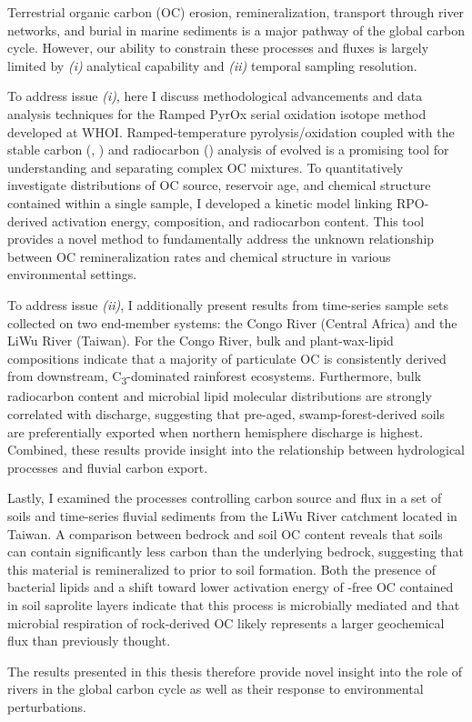 \setcounter{savepage}{\thepage}
\begin{abstractpage}

Terrestrial organic carbon (OC) erosion, remineralization, transport through river networks, and burial in marine sediments is a major pathway of the global carbon cycle. However, our ability to constrain these processes and fluxes is largely limited by \textit{(i)} analytical capability and \textit{(ii)} temporal sampling resolution. 

To address issue \textit{(i)}, here I discuss methodological advancements and data analysis techniques for the Ramped PyrOx serial oxidation isotope method developed at WHOI. Ramped-temperature pyrolysis/oxidation coupled with the stable carbon (, ) and radiocarbon () analysis of evolved  is a promising tool for understanding and separating complex OC mixtures. To quantitatively investigate distributions of OC source, reservoir age, and chemical structure contained within a single sample, I developed a kinetic model linking RPO-derived activation energy,  composition, and radiocarbon content. This tool provides a novel method to fundamentally address the unknown relationship between OC remineralization rates and chemical structure in various environmental settings.

To address issue \textit{(ii)}, I additionally present results from time-series sample sets collected on two end-member systems: the Congo River (Central Africa) and the LiWu River (Taiwan). For the Congo River, bulk and plant-wax-lipid  compositions indicate that a majority of particulate OC is consistently derived from downstream, C\textsubscript{3}-dominated rainforest ecosystems.  Furthermore, bulk radiocarbon content and microbial lipid molecular distributions are strongly correlated with discharge, suggesting that pre-aged, swamp-forest-derived soils are preferentially exported when northern hemisphere discharge is highest. Combined, these results provide insight into the relationship between hydrological processes and fluvial carbon export.

Lastly, I examined the processes controlling carbon source and flux in a set of soils and time-series fluvial sediments from the LiWu River catchment located in Taiwan. A comparison between bedrock and soil OC content reveals that soils can contain significantly less carbon than the underlying bedrock, suggesting that this material is remineralized to  prior to soil formation. Both the presence of bacterial lipids and a shift toward lower activation energy of -free OC contained in soil saprolite layers indicate that this process is microbially mediated and that microbial respiration of rock-derived OC likely represents a larger geochemical flux than previously thought.

The results presented in this thesis therefore provide novel insight into the role of rivers in the global carbon cycle as well as their response to environmental perturbations.

\end{abstractpage}

